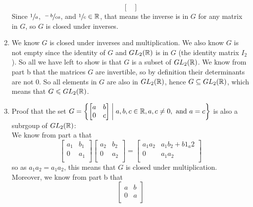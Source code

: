 \documentclass[12pt]{article}
\begin{document}
\begin{enumerate}[label=\textbf{\alph*.}]
\[\begin{bmatrix}
            \end{bmatrix} \]
            Since $\sfrac{1}{a}$, $\sfrac{-b}{ca}$,
            and $\sfrac{1}{c} \in \mathbb{R}$,
            that means the inverse is in $G$ for any matrix in $G$,
            so $G$ is closed under inverses.
        \item
            We know $G$ is closed under inverses and multiplication.
            We also know $G$ is not empty since the identity of $G$
            and $GL_2(\mathbb{R})$ is in $G$ (the identity matrix $I_2$).
            So all we have left to show is that $G$ is a subset of $GL_2(\mathbb{R})$.
            We know from part b that the matrices $G$ are invertible,
            so by definition their determinants are not 0.
            So all elements in $G$ are also in $GL_2(\mathbb{R})$,
            hence $G \subseteq GL_2(\mathbb{R})$,
            which means that $G \leqslant GL_2(\mathbb{R})$.
        \item
            Proof that the set
            $G = \left\{ \begin{bmatrix} a & b \\ 0 & c \end{bmatrix} \;
            \middle\vert \; a, b, c \in \mathbb{R}, a, c \neq 0,
            \text{ and } a = c \right\}$
            is also a subrgoup of $GL_2(\mathbb{R})$: \\
            We know from part a that
            \[ \begin{bmatrix}
            a_1 & b_1 \\
            0 & a_1 \\
            \end{bmatrix}
            \begin{bmatrix}
            a_2 & b_2 \\
            0 & a_2 \\
            \end{bmatrix}
            = \begin{bmatrix}
            a_1a_2 & a_1b_2 + b1_a2 \\
            0 & a_1a_2 \\
            \end{bmatrix} \]
            so as $a_1a_2 = a_1a_2$,
            this means that $G$ is closed under multiplication. \\
            Moreover, we know from part b that
            \[ \begin{bmatrix}
            a & b \\
            0 & a \\

\end{bmatrix}\]
\end{enumerate}
\end{document}
